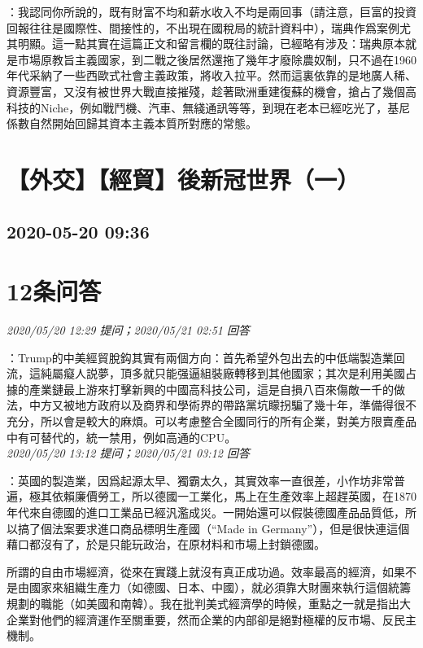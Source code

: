 \documentclass[twocolumn]{ctexart}
\begin{document}
：我認同你所說的，既有財富不均和薪水收入不均是兩回事（請注意，巨富的投資回報往往是國際性、間接性的，不出現在國稅局的統計資料中），瑞典作爲案例尤其明顯。這一點其實在這篇正文和留言欄的既往討論，已經略有涉及：瑞典原本就是市場原教旨主義國家，到二戰之後居然還拖了幾年才廢除農奴制，只不過在1960年代采納了一些西歐式社會主義政策，將收入拉平。然而這裏依靠的是地廣人稀、資源豐富，又沒有被世界大戰直接摧殘，趁著歐洲重建復蘇的機會，搶占了幾個高科技的Niche，例如戰鬥機、汽車、無綫通訊等等，到現在老本已經吃光了，基尼係數自然開始回歸其資本主義本質所對應的常態。
\\


\section{【外交】【經貿】後新冠世界（一）}
\subsection{2020-05-20 09:36}


\section{12条问答}

\textit{\hfill\noindent\small 2020/05/20 12:29 提问；2020/05/21 02:51 回答}

：Trump的中美經貿脫鈎其實有兩個方向：首先希望外包出去的中低端製造業回流，這純屬癡人説夢，頂多就只能强逼組裝廠轉移到其他國家；其次是利用美國占據的產業鏈最上游來打擊新興的中國高科技公司，這是自損八百來傷敵一千的做法，中方又被地方政府以及商界和學術界的帶路黨坑矇拐騙了幾十年，準備得很不充分，所以會是較大的麻煩。可以考慮整合全國同行的所有企業，對美方限賣產品中有可替代的，統一禁用，例如高通的CPU。
\\

\textit{\hfill\noindent\small 2020/05/20 13:12 提问；2020/05/21 03:12 回答}

：英國的製造業，因爲起源太早、獨霸太久，其實效率一直很差，小作坊非常普遍，極其依賴廉價勞工，所以德國一工業化，馬上在生產效率上超趕英國，在1870年代來自德國的進口工業品已經汎濫成災。一開始還可以假裝德國產品品質低，所以搞了個法案要求進口商品標明生產國（“Made in Germany”），但是很快連這個藉口都沒有了，於是只能玩政治，在原材料和市場上封鎖德國。

所謂的自由市場經濟，從來在實踐上就沒有真正成功過。效率最高的經濟，如果不是由國家來組織生產力（如德國、日本、中國），就必須靠大財團來執行這個統籌規劃的職能（如美國和南韓）。我在批判美式經濟學的時候，重點之一就是指出大企業對他們的經濟運作至關重要，然而企業的内部卻是絕對極權的反市場、反民主機制。
\\
\end{document}
